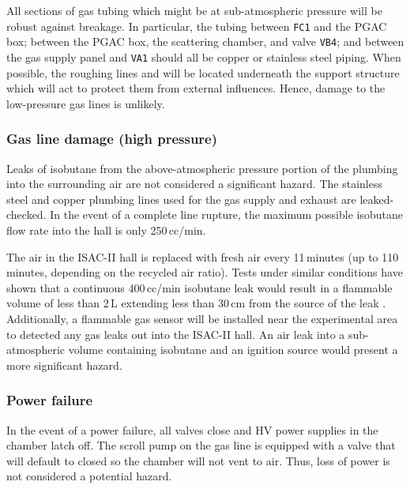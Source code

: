 All sections of gas tubing which might be at sub-atmospheric pressure will be robust against
breakage. In particular, the tubing between \texttt{FC1} and the PGAC box; between the PGAC box, the scattering chamber, and valve
\texttt{VB4}; and between the gas supply panel and \texttt{VA1} should all be copper or stainless steel piping.
When possible, the roughing lines and will be located underneath the support structure which will act to protect them from external influences. %
Hence, damage to the low-pressure gas lines is unlikely.

\subsubsection{Gas line damage (high pressure)}
Leaks of isobutane from the above-atmospheric pressure portion of the plumbing into the surrounding air are not considered a significant hazard.  The stainless steel and copper plumbing lines used for the gas supply and exhaust are leaked-checked.  In the event of a complete line rupture, the maximum possible isobutane flow rate into the hall is only 250\,cc/min.

The air in the ISAC-II hall is replaced with fresh air every 11\,minutes (up to 110 minutes, depending on the recycled air ratio).
Tests under similar conditions have shown that a continuous 400\,cc/min isobutane leak would result in a flammable volume of less than 2\,L extending less than 30\,cm from the source of the leak   \cite{Openshaw_2006}. Additionally, a flammable gas sensor will be installed near the experimental area to detected any gas
leaks out into the ISAC-II hall.  An air leak into a sub-atmospheric volume containing isobutane and an ignition source would present a more significant hazard.

\subsubsection{Power failure} In the event of a power failure, all valves close and HV power supplies in the chamber latch off. The
scroll pump on the gas line is equipped with a valve that will default to closed so the chamber will
not vent to air. Thus, loss of power is not considered a potential hazard.